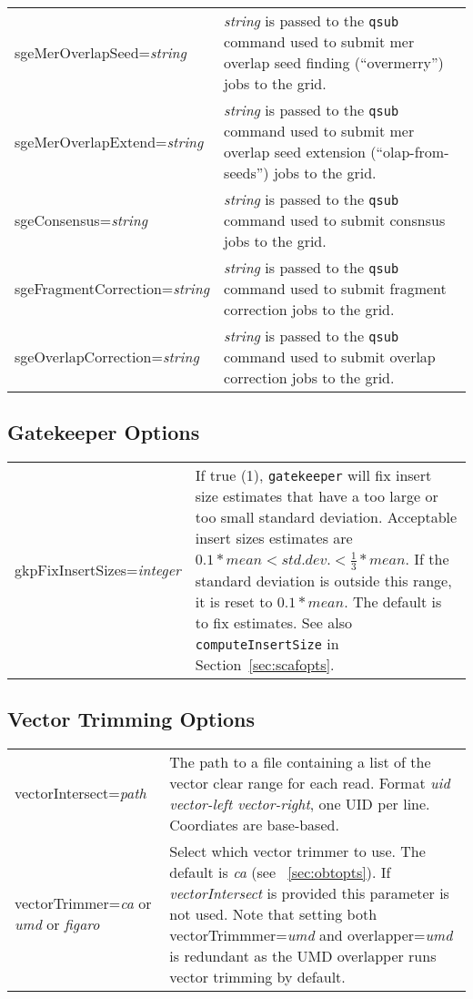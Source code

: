 \documentclass[twoside,11pt]{article}
\begin{document}
\begin{longtable}{lp{3.0in}}
sgeMerOverlapSeed={\it string} &
{\it string} is passed to the {\tt qsub} command used to submit mer overlap seed finding (``overmerry'') jobs to the grid.
\\

sgeMerOverlapExtend={\it string} &
{\it string} is passed to the {\tt qsub} command used to submit mer overlap seed extension (``olap-from-seeds'') jobs to the grid.
\\

sgeConsensus={\it string} &
{\it string} is passed to the {\tt qsub} command used to submit consnsus jobs to the grid.
\\

sgeFragmentCorrection={\it string} &
{\it string} is passed to the {\tt qsub} command used to submit fragment correction jobs to the grid.
\\

sgeOverlapCorrection={\it string} &
{\it string} is passed to the {\tt qsub} command used to submit overlap correction jobs to the grid.
\\

\end{longtable}


\subsection{Gatekeeper Options}
\label{sec:gkpopts}

\begin{longtable}{lp{3.0in}}
gkpFixInsertSizes={\it integer} &
If true (1), {\tt gatekeeper} will fix insert size estimates that have
a too large or too small standard deviation.  Acceptable insert sizes
estimates are $0.1*mean < std.dev. < \frac{1}{3}*mean$.  If the
standard deviation is outside this range, it is reset to $0.1 * mean$.
The default is to fix estimates.
See also {\tt computeInsertSize} in Section~\ref{sec:scafopts}.
\\
\end{longtable}


\subsection{Vector Trimming Options}
\begin{longtable}{lp{3.0in}}
vectorIntersect={\it path} &
The path to a file containing a list of the vector clear range for
each read.  Format {\it uid vector-left vector-right}, one UID per
line.  Coordiates are base-based.
\\
vectorTrimmer={\em ca} or {\em umd} or {\em figaro} &
Select which vector trimmer to use. The default is {\em ca} (see ~\ref{sec:obtopts}). 
If {\em vectorIntersect} is provided this parameter is not used. Note that setting both 
vectorTrimmmer={\em umd} and overlapper={\em umd} is redundant as the UMD overlapper 
runs vector trimming by default.
\\
\end{longtable}
\end{document}
